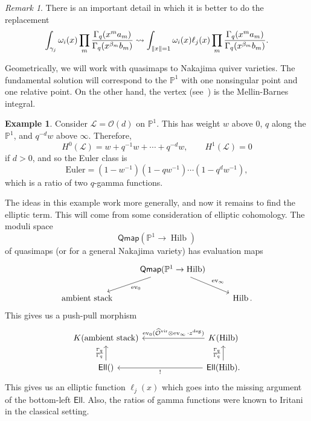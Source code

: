\documentclass[leqno, openany]{memoir}
\theoremstyle{definition}
\newtheorem{exm}[thm]{Example}
\theoremstyle{remark}
\newtheorem{rmk}[thm]{Remark}
\theoremstyle{plain}
\theoremstyle{definition}
\theoremstyle{remark}
\renewcommand{\P}{\mathbb{P}}
\newcommand{\mc}[1]{\mathcal{#1}}
\newcommand{\mr}[1]{\mathrm{#1}}
\newcommand{\ms}[1]{\mathsf{#1}}
\newcommand{\on}[1]{\operatorname{#1}}
\newcommand{\wh}[1]{\widehat{#1}}
\DeclareMathOperator{\Hilb}{Hilb}
\begin{document}
\begin{rmk}
    There is an important detail in which it is better to do the replacement
    \[ \int_{\gamma_j} \omega_i(x) \prod_m \frac{\Gamma_q(x^m a_m)}{\Gamma_q(x^{\beta_m} b_m)} \rightsquigarrow \int_{\norm{x}=1} \omega_i(x) \ell_j(x) \prod_m \frac{\Gamma_q(x^m a_m)}{\Gamma_q(x^{\beta_m} b_m)}. \]
\end{rmk}

Geometrically, we will work with quasimaps to Nakajima quiver varieties. The fundamental solution will correspond to the $\P^1$ with one nonsingular point and one relative point. On the other hand, the vertex (see~\cite[Section 7.4]{pcmi}) is the Mellin-Barnes integral.

\begin{exm}
    Consider $\mc{L} = \mc{O}(d)$ on $\P^1$. This has weight $w$ above $0$, $q$ along the $\P^1$, and $q^{-d} w$ above $\infty$. Therefore,
    \[ H^0(\mc{L}) = w + q^{-1} w + \cdots + q^{-d} w, \qquad H^1(\mc{L}) = 0 \]
    if $d > 0$, and so the Euler class is
    \[ \mr{Euler} = (1-w^{-1})(1-qw^{-1}) \cdots (1-q^dw^{-1}), \]
    which is a ratio of two $q$-gamma functions.
\end{exm}

The ideas in this example work more generally, and now it remains to find the elliptic term. This will come from some consideration of elliptic cohomology. The moduli space
\[ \ms{Qmap}(\P^1 \to \Hilb) \]
of quasimaps (or for a general Nakajima variety) has evaluation maps
\begin{equation*}
\begin{tikzcd}
    & \ms{Qmap}(\P^1 \to \Hilb) \ar{dl}{\mr{ev}_0} \ar{dr}{\mr{ev}_{\infty}} \\
    \text{ambient stack} & & \Hilb.
\end{tikzcd}
\end{equation*}
This gives us a push-pull morphism
\begin{equation*}
\begin{tikzcd}
    K(\text{ambient stack}) & & & K(\Hilb) \ar[swap]{lll}{\on{ev}_0(\wh{\mc{O}}^{\mr{vir}} \otimes \on{ev}_{\infty} \cdot z^{\mr{deg}})} \\
    \ms{Ell}() \ar{u}{\frac{\Gamma_q}{\Gamma_q}} & & & \ms{Ell}(\Hilb) \ar{u}{\frac{\Gamma_q}{\Gamma_q}} \ar{lll}{!}.
\end{tikzcd}
\end{equation*}
This gives us an elliptic function $\ell_j(x)$ which goes into the missing argument of the bottom-left $\ms{Ell}$. Also, the ratios of gamma functions were known to Iritani in the classical setting.
\end{document}
